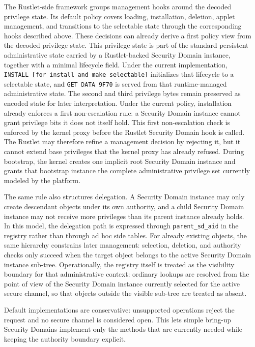 The Rustlet-side framework groups management hooks around the decoded
privilege state. Its default policy covers loading, installation, deletion,
applet management, and transitions to the selectable state through the
corresponding hooks described above. These decisions can already derive a
first policy view from the decoded privilege state. This privilege state is part of the
standard persistent administrative state carried by a Rustlet-backed
Security Domain instance, together with a minimal lifecycle field.
Under the current implementation, \texttt{INSTALL [for install and make
selectable]} initializes that lifecycle to a selectable state, and
\texttt{GET DATA 9F70} is served from that runtime-managed administrative
state. The second and third privilege bytes remain preserved as encoded
state for later interpretation. Under the current policy, installation
already enforces a first non-escalation rule: a Security Domain instance
cannot grant privilege bits it does not itself hold. This first
non-escalation check is enforced by the kernel proxy before the Rustlet
Security Domain hook is called. The Rustlet may therefore refine a
management decision by rejecting it, but it cannot extend base
privileges that the kernel proxy has already refused. During bootstrap,
the kernel creates one implicit root Security Domain instance and grants
that bootstrap instance the complete administrative privilege set currently
modeled by the platform.

The same rule also structures delegation. A Security Domain instance may only
create descendant objects under its own authority, and a child Security Domain
instance may not receive more privileges than its parent instance already
holds. In this model, the delegation path is expressed through
\texttt{parent\_sd\_aid} in the registry rather than through ad hoc side
tables. For already existing objects, the same hierarchy constrains later
management: selection, deletion, and authority checks only succeed when the
target object belongs to the active Security Domain instance sub-tree.
Operationally, the registry itself is treated as the visibility boundary for
that administrative context: ordinary lookups are resolved from the point of
view of the Security Domain instance currently selected for the active secure
channel, so that objects outside the visible sub-tree are treated as absent.

Default implementations are conservative: unsupported operations reject
the request and no secure channel is considered open. This lets simple
bring-up Security Domains implement only the methods that are currently
needed while keeping the authority boundary explicit.


